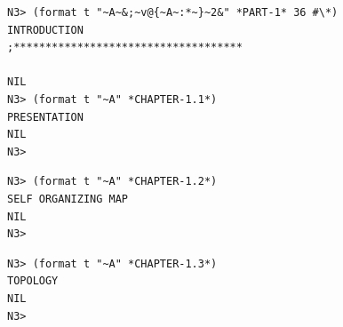 \documentclass{article}
\begin{document}
%
%

\newpage
\begin{spacing}{0.1}
\bigskip
\bigskip
\renewcommand*\contentsname{Contents}
\tableofcontents
\end{spacing}

\bigskip
\bigskip
\renewcommand*\listfigurename{List of figures}
\listoffigures

\bigskip
\bigskip
\renewcommand*{\listtablename}{List of tables}
\listoftables

\bigskip
\bigskip
\bigskip

\begin{lstlisting}[language=sectitle]
N3> (format t "~A~&;~v@{~A~:*~}~2&" *PART-1* 36 #\*)
INTRODUCTION
;************************************

NIL
N3> (format t "~A" *CHAPTER-1.1*)
PRESENTATION
NIL
N3> 
\end{lstlisting}
{}

\bigskip

\bigskip

\begin{lstlisting}[language=sectitle]
N3> (format t "~A" *CHAPTER-1.2*)
SELF ORGANIZING MAP
NIL
N3> 
\end{lstlisting}

\bigskip

\bigskip

\begin{lstlisting}[language=sectitle]
N3> (format t "~A" *CHAPTER-1.3*)
TOPOLOGY
NIL
N3> 
\end{lstlisting}
\label{topology}

\bigskip

\bigskip
\bigskip
\end{document}
